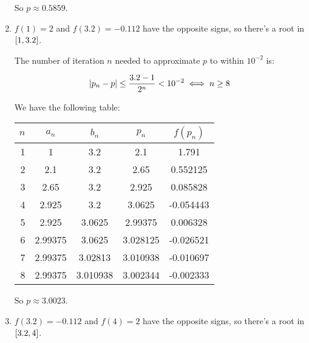 \documentclass[../../Assignments.tex]{subfiles}
\begin{document}
\begin{solution}
\begin{enumerate}[label = (\alph*)]
            So \(p \approx \num{0.5859}\).

        \item \(f(1) = 2\) and \(f(\num{3.2}) = \num{-0.112}\) have the opposite
            signs, so there's a root in \(\interval{1}{\num{3.2}}\).

            The number of iteration \(n\) needed to approximate \(p\) to within
            \(10^{-2}\) is:

            \[\abs{p_n - p} \leq \frac{\num{3.2} - 1}{2^n} < 10^{-2} \iff n \geq 8\]

            We have the following table:

            \begin{table}[H]
                \centering
                \begin{tabular}{r S[table-format=1.5] S[table-format=1.6] S[table-format=1.6] S[table-format=-1.6]}
                    \toprule
                    \(n\)  &  {\(a_n\)}  &  {\(b_n\)}  &  {\(p_n\)}  &  {\(f(p_n)\)}  \\
                      &  1          &  3.2        &  2.1        &   1.791        \\
                        2  &  2.1        &  3.2        &  2.65       &   0.552125     \\
                        3  &  2.65       &  3.2        &  2.925      &   0.085828     \\
                        4  &  2.925      &  3.2        &  3.0625     &  -0.054443     \\
                        5  &  2.925      &  3.0625     &  2.99375    &   0.006328     \\
                        6  &  2.99375    &  3.0625     &  3.028125   &  -0.026521     \\
                        7  &  2.99375    &  3.02813    &  3.010938   &  -0.010697     \\
                        8  &  2.99375    &  3.010938   &  3.002344   &  -0.002333     \\
                    \bottomrule
                \end{tabular}
            \end{table}

            So \(p \approx \num{3.0023}\).

        \item \(f(\num{3.2}) = \num{-0.112}\) and \(f(4) = 2\) have the opposite
            signs, so there's a root in \(\interval{\num{3.2}}{4}\).


\end{enumerate}
\end{solution}
\end{document}
